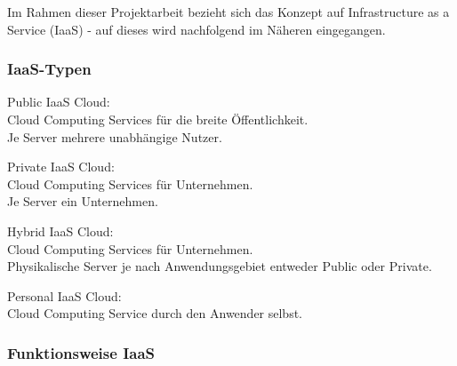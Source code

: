 \documentclass[12pt,a4paper,bibliography=totocnumbered,listof=totocnumbered]{scrartcl}
\begin{document}
Im Rahmen dieser Projektarbeit bezieht sich das Konzept auf Infrastructure as a Service (IaaS) - auf dieses wird nachfolgend im Näheren eingegangen.

\subsubsection{IaaS-Typen}
\begin{compactitem}
\item Public IaaS Cloud:\\
Cloud Computing Services für die breite Öffentlichkeit.\\
Je Server mehrere unabhängige Nutzer.
\item Private IaaS Cloud:\\
Cloud Computing Services für Unternehmen.\\
Je Server ein Unternehmen.
\item Hybrid IaaS Cloud:\\
Cloud Computing Services für Unternehmen.\\
Physikalische Server je nach Anwendungsgebiet entweder Public oder Private.
\item Personal IaaS Cloud:\\
Cloud Computing Service durch den Anwender selbst.
\end{compactitem}
\pagebreak

\subsubsection{Funktionsweise IaaS}
\end{document}

